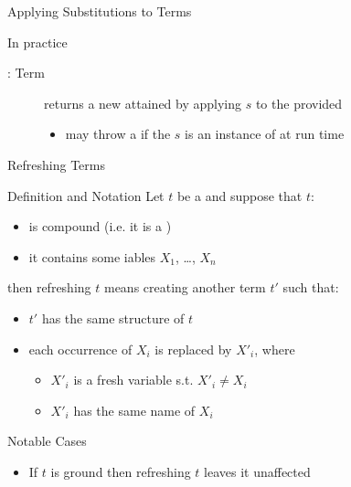 \documentclass[handout]{beamer}
\begin{document}
\begin{frame}[allowframebreaks]{Applying Substitutions to Terms}
\begin{block}{In practice}
\begin{description}
            \item[: Term] returns a new  attained by applying $s$ to the provided 
            \begin{itemize}\small
                \item may throw a \alert{} if the $s$ is an instance of  at run time
            \end{itemize}
        \end{description}
    \end{block}

\end{frame}

\begin{frame}[allowframebreaks]{Refreshing Terms}
    \begin{block}{Definition and Notation}
        Let $t$ be a  and suppose that $t$:
        \begin{itemize}
            \item is \alert{compound} (i.e. it is a )
            \item it contains some iables $X_1$, \ldots, $X_n$
        \end{itemize}
        then \alert{refreshing} $t$ means creating another term $t'$ such that:
        \begin{itemize}
            \item $t'$ has the same structure of $t$
            \item each occurrence of $X_i$ is replaced by $X'_i$, where
            \begin{itemize}
                \item $X'_i$ is a fresh variable s.t. $X'_i \neq X_i$
                \item $X'_i$ has the same name of $X_i$
            \end{itemize}
        \end{itemize}
    \end{block}

    \begin{alertblock}{Notable Cases}
        \begin{itemize}
            \item If $t$ is \alert{ground} then refreshing $t$ leaves it unaffected
        \end{itemize}
    \end{alertblock}


\end{frame}
\end{document}
